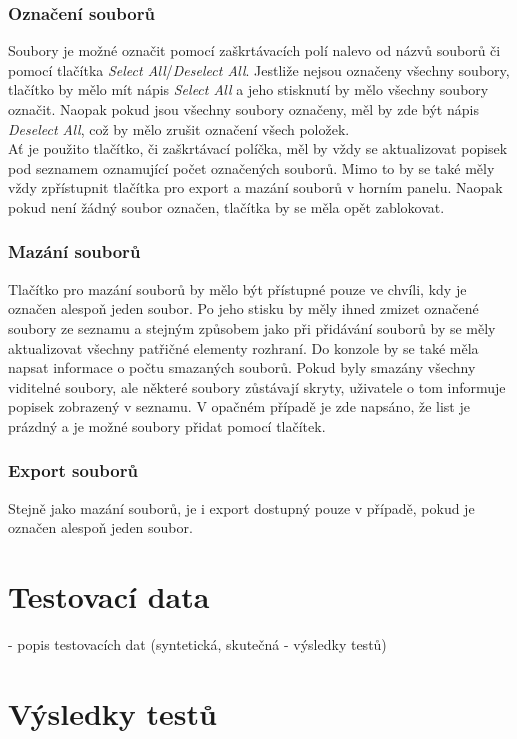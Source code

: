 			\subsubsection{Označení souborů}
				Soubory je možné označit pomocí zaškrtávacích polí nalevo od názvů souborů či pomocí tlačítka \emph{Select All}/\emph{Deselect All}. Jestliže nejsou označeny všechny soubory, tlačítko by mělo mít nápis \emph{Select All} a jeho stisknutí by mělo všechny soubory označit. Naopak pokud jsou všechny soubory označeny, měl by zde být nápis \emph{Deselect All}, což by mělo zrušit označení všech položek.\\
				
				Ať je použito tlačítko, či zaškrtávací políčka, měl by vždy se aktualizovat popisek pod seznamem oznamující počet označených souborů. Mimo to by se také měly vždy zpřístupnit tlačítka pro export a mazání souborů v horním panelu. Naopak pokud není žádný soubor označen, tlačítka by se měla opět zablokovat.
			
			\subsubsection{Mazání souborů}
				Tlačítko pro mazání souborů by mělo být přístupné pouze ve chvíli, kdy je označen alespoň jeden soubor. Po jeho stisku by měly ihned zmizet označené soubory ze seznamu a stejným způsobem jako při přidávání souborů by se měly aktualizovat všechny patřičné elementy rozhraní. Do konzole by se také měla napsat informace o počtu smazaných souborů. Pokud byly smazány všechny viditelné soubory, ale některé soubory zůstávají skryty, uživatele o tom informuje popisek zobrazený v seznamu. V opačném případě je zde napsáno, že list je prázdný a je možné soubory přidat pomocí tlačítek.
			
			\subsubsection{Export souborů}
				Stejně jako mazání souborů, je i export dostupný pouze v případě, pokud je označen alespoň jeden soubor. 
				
	
	\section{Testovací data}
		 - popis testovacích dat (syntetická, skutečná - výsledky testů)
		 
		 
	\section{Výsledky testů}

